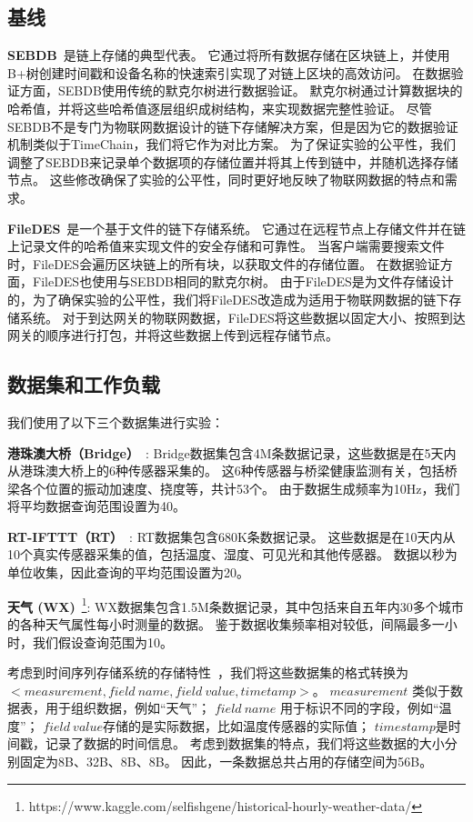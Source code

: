 \subsection{基线}
\textbf{SEBDB}~\cite{zhu2019sebdb}是链上存储的典型代表。
它通过将所有数据存储在区块链上，并使用B+树创建时间戳和设备名称的快速索引实现了对链上区块的高效访问。
在数据验证方面，SEBDB使用传统的默克尔树进行数据验证。
默克尔树通过计算数据块的哈希值，并将这些哈希值逐层组织成树结构，来实现数据完整性验证。
尽管SEBDB不是专门为物联网数据设计的链下存储解决方案，但是因为它的数据验证机制类似于TimeChain，我们将它作为对比方案。
为了保证实验的公平性，我们调整了SEBDB来记录单个数据项的存储位置并将其上传到链中，并随机选择存储节点。
这些修改确保了实验的公平性，同时更好地反映了物联网数据的特点和需求。

\textbf{FileDES}~\cite{xu2024filedes}是一个基于文件的链下存储系统。
它通过在远程节点上存储文件并在链上记录文件的哈希值来实现文件的安全存储和可靠性。
当客户端需要搜索文件时，FileDES会遍历区块链上的所有块，以获取文件的存储位置。
在数据验证方面，FileDES也使用与SEBDB相同的默克尔树。
由于FileDES是为文件存储设计的，为了确保实验的公平性，我们将FileDES改造成为适用于物联网数据的链下存储系统。
对于到达网关的物联网数据，FileDES将这些数据以固定大小、按照到达网关的顺序进行打包，并将这些数据上传到远程存储节点。

\subsection{数据集和工作负载}

我们使用了以下三个数据集进行实验：

\textbf{港珠澳大桥（Bridge）}~\cite{zhang2023edge}:
Bridge数据集包含4M条数据记录，这些数据是在5天内从港珠澳大桥上的6种传感器采集的。
这6种传感器与桥梁健康监测有关，包括桥梁各个位置的振动加速度、挠度等，共计53个。
由于数据生成频率为10Hz，我们将平均数据查询范围设置为40。

\textbf{RT-IFTTT（RT）}~\cite{heo2017rt}:
RT数据集包含680K条数据记录。
这些数据是在10天内从10个真实传感器采集的值，包括温度、湿度、可见光和其他传感器。
数据以秒为单位收集，因此查询的平均范围设置为20。

\textbf{天气 (WX)}~\footnote{https://www.kaggle.com/selfishgene/historical-hourly-weather-data/}:
WX数据集包含1.5M条数据记录，其中包括来自五年内30多个城市的各种天气属性每小时测量的数据。
鉴于数据收集频率相对较低，间隔最多一小时，我们假设查询范围为10。

考虑到时间序列存储系统的存储特性~\cite{naqvi2017time}，我们将这些数据集的格式转换为\\ $<measurement, field~name, field~value, timetamp>$。
$measurement$ 类似于数据表，用于组织数据，例如“天气”；
$field~name$ 用于标识不同的字段，例如“温度”；
$field~value$存储的是实际数据，比如温度传感器的实际值；
$timestamp$是时间戳，记录了数据的时间信息。
考虑到数据集的特点，我们将这些数据的大小分别固定为8B、32B、8B、8B。
因此，一条数据总共占用的存储空间为56B。

